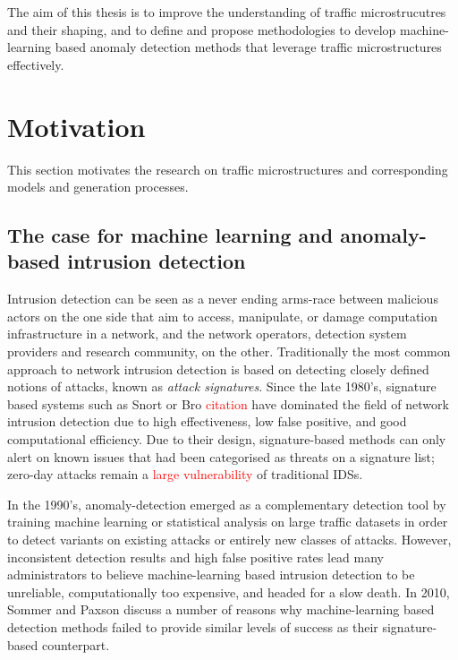 The aim of this thesis is to improve the understanding of traffic microstrucutres and their shaping, and to define and propose methodologies to develop machine-learning based anomaly detection methods that leverage traffic microstructures effectively.







\section{Motivation}

This section motivates the research on traffic microstructures and corresponding models and generation processes.

\subsection{The case for machine learning and anomaly-based intrusion detection}

Intrusion detection can be seen as a never ending arms-race between malicious actors on the one side that aim to access, manipulate, or damage computation infrastructure in a network, and the network operators, detection system providers and research community, on  the other. Traditionally the most common approach to network intrusion detection is based on detecting closely defined notions of attacks, known as \emph{attack signatures}. Since the late 1980's, signature based systems such as Snort or Bro \textcolor{red}{citation} have dominated the field of network intrusion detection due to high effectiveness, low false positive, and good computational efficiency. Due to their design, signature-based methods can only alert on known issues that had been categorised as threats on a signature list; zero-day attacks remain a \textcolor{red}{large vulnerability} of traditional IDSs.

In the 1990's, anomaly-detection emerged as a complementary detection tool by training machine learning or statistical analysis on large traffic datasets in order to detect variants on existing attacks or entirely new classes of attacks. However, inconsistent detection results and high false positive rates lead many administrators to believe machine-learning based intrusion detection to be unreliable, computationally too expensive, and headed for a slow death.
In 2010, Sommer and Paxson discuss a number of reasons why machine-learning based detection methods failed to provide similar levels of success as their signature-based counterpart.

